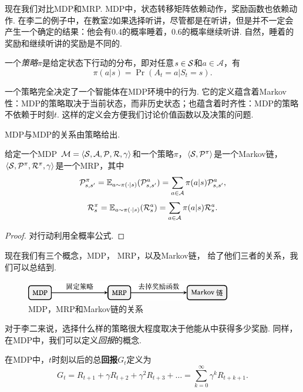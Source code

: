 现在我们对比MDP和MRP. MDP中，状态转移矩阵依赖动作，奖励函数也依赖动作. 在李二的例子中，在教室2如果选择听讲，尽管都是在听讲，但是并不一定会产生一个确定的结果：他会有$0.4$的概率睡着，$0.6$的概率继续听讲. 自然，睡着的奖励和继续听讲的奖励是不同的.

\begin{definition}[策略]
一个\emph{策略}$\pi$是给定状态下行动的分布，即对任意$s\in\mathcal S$和$a\in\mathcal A$，有
    \[\pi(a|s) = \Pr(A_t=a | S_t = s).\]
\end{definition}
一个策略完全决定了一个智能体在MDP环境中的行为. 它的定义蕴含着Markov性：MDP的策略取决于当前状态，而非历史状态；也蕴含着时齐性：MDP的策略不依赖于时刻$t$. 这样的定义会方便我们讨论价值函数以及决策的问题.

MDP与MDP的关系由策略给出. 
\begin{proposition}
给定一个MDP $\mathcal M=\langle\mathcal S,\mathcal A,\mathcal P,\mathcal R, \gamma\rangle$和一个策略$\pi$，$\langle \mathcal S, \mathcal P^{\pi}\rangle$是一个Markov链，$\langle\mathcal S,\mathcal P^{\pi}, \mathcal R^{\pi}, \gamma\rangle$是一个MRP，其中
\[\mathcal P_{s,s'}^{\pi} = \mathbb{E}_{a\sim\pi(\cdot|s)}(\mathcal P^a_{s,s'})=\sum_{a\in \mathcal A}\pi(a|s)\mathcal P_{s,s'}^{a},\]
    \[\mathcal R_s^{\pi} =\mathbb{E}_{a\sim\pi(\cdot|s)}(\mathcal R^a_s)=\sum_{a\in\mathcal A}\pi(a|s)\mathcal R_s^a.\]
\end{proposition}
\begin{proof}
对行动利用全概率公式. 
\end{proof}

现在我们有三个概念，MDP， MRP，以及Markov链， 给了他们三者的关系，我们可以总结到. 

\begin{figure}[ht]
\centering
\includegraphics[width=0.8\textwidth]{figures/Markov-chain/MDP-MRP-Markov-chain.pdf}
\caption{MDP，MRP和Markov链的关系}\label{fig:MDP-MRP-MarkovChain}
\end{figure}

对于李二来说，选择什么样的策略很大程度取决于他能从中获得多少奖励. 同样，在MDP中，我们可以定义\emph{回报}的概念. 

\begin{definition}[回报]
在MDP中，$t$时刻以后的总\textbf{回报}$G_t$定义为
    \[G_t = R_{t+1} + \gamma R_{t+2} + \gamma^2 R_{t+3} + \dots = \sum_{k=0}^\infty \gamma^k R_{t+k+1}.\]
\end{definition}

